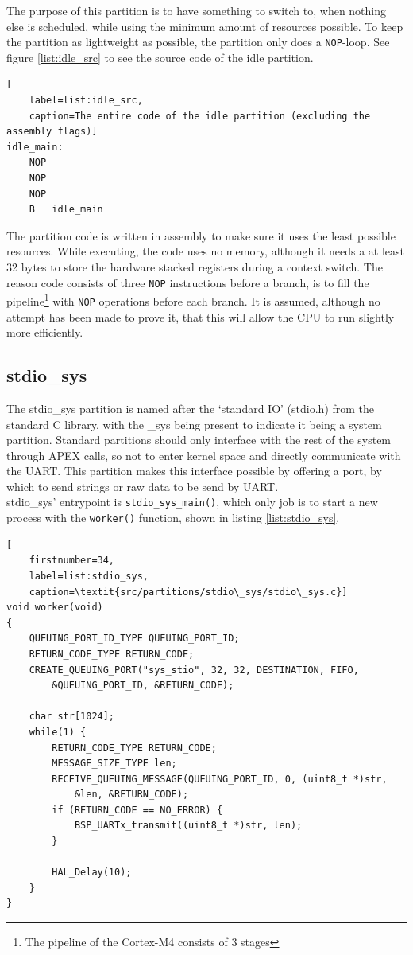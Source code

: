 The purpose of this partition is to have something to switch to, when nothing
else is scheduled, while using the minimum amount of resources possible.
To keep the partition as lightweight as possible, the partition only does a
\texttt{NOP}-loop. See figure \ref{list:idle_src} to see the source code of the
idle partition.\\
\begin {lstlisting}[
	label=list:idle_src,
	caption=The entire code of the idle partition (excluding the assembly flags)]
idle_main:
	NOP
	NOP
	NOP
	B   idle_main
\end{lstlisting}

The partition code is written in assembly to make sure it uses the least possible
resources. While executing, the code uses no memory, although it needs a at
least 32 bytes to store the hardware stacked registers during a context switch.
The reason code consists of three \texttt{NOP} instructions before a branch, is
to fill the pipeline\footnote{The pipeline of the Cortex-M4 consists of 3 stages}
with \texttt{NOP} operations before each branch. It is assumed, although no
attempt has been made to prove it, that this will allow the CPU to run slightly
more efficiently.

\subsection{stdio\_sys}
\label{impl:stdio_sys}
The stdio\_sys partition is named after the `standard IO' (stdio.h) from the
standard C library, with the \_sys being present to indicate it being a system
partition. Standard partitions should only interface with the rest of the system
through APEX calls, so not to enter kernel space and directly communicate with
the UART. This partition makes this interface possible by offering a port, by
which to send strings or raw data to be send by UART.\\

stdio\_sys' entrypoint is \texttt{stdio\_sys\_main()}, which only job is to
start a new process with the \texttt{worker()} function, shown in listing
\ref{list:stdio_sys}.

\begin{minipage}{\linewidth}
\begin{lstlisting}[
	firstnumber=34,
	label=list:stdio_sys,
	caption=\textit{src/partitions/stdio\_sys/stdio\_sys.c}]
void worker(void)
{
    QUEUING_PORT_ID_TYPE QUEUING_PORT_ID;
    RETURN_CODE_TYPE RETURN_CODE;
    CREATE_QUEUING_PORT("sys_stio", 32, 32, DESTINATION, FIFO,
		&QUEUING_PORT_ID, &RETURN_CODE);

    char str[1024];
    while(1) {
        RETURN_CODE_TYPE RETURN_CODE;
        MESSAGE_SIZE_TYPE len;
        RECEIVE_QUEUING_MESSAGE(QUEUING_PORT_ID, 0, (uint8_t *)str,
			&len, &RETURN_CODE);
        if (RETURN_CODE == NO_ERROR) {
            BSP_UARTx_transmit((uint8_t *)str, len);
        }

        HAL_Delay(10);
    }
}
\end{lstlisting}
\end{minipage}

